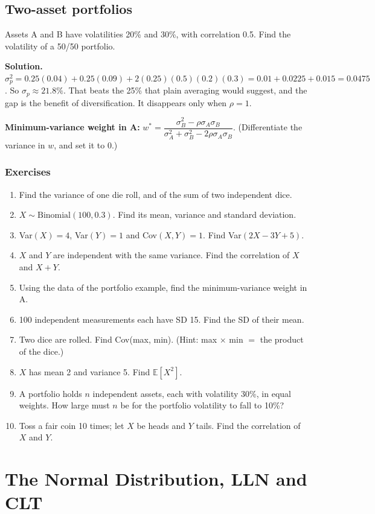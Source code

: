 \documentclass[11pt,a4paper,openany]{report}
\newenvironment{exercises}{\subsection*{Exercises \thechapter}\begin{enumerate}[label=\textbf{\thechapter.\arabic*},leftmargin=3.2em]}{\end{enumerate}}
\newcommand{\E}{\mathbb{E}}
\begin{document}
\section{Two-asset portfolios}
\begin{example}
Assets A and B have volatilities 20\% and 30\%, with correlation 0.5. Find the volatility of a 50/50 portfolio.

\textbf{Solution.} $\sigma_p^2=0.25(0.04)+0.25(0.09)+2(0.25)(0.5)(0.2)(0.3)=0.01+0.0225+0.015=0.0475$. So $\sigma_p\approx\mathbf{21.8\%}$. That beats the 25\% that plain averaging would suggest, and the gap is the benefit of diversification. It disappears only when $\rho=1$.
\end{example}
\textbf{Minimum-variance weight in A:} $w^*=\dfrac{\sigma_B^2-\rho\sigma_A\sigma_B}{\sigma_A^2+\sigma_B^2-2\rho\sigma_A\sigma_B}$. (Differentiate the variance in $w$, and set it to 0.)

\begin{exercises}
\item Find the variance of one die roll, and of the sum of two independent dice.
\item $X\sim\text{Binomial}(100,0.3)$. Find its mean, variance and standard deviation.
\item Var$(X)=4$, Var$(Y)=1$ and Cov$(X,Y)=1$. Find Var$(2X-3Y+5)$.
\item $X$ and $Y$ are independent with the same variance. Find the correlation of $X$ and $X+Y$.
\item Using the data of the portfolio example, find the minimum-variance weight in A.
\item 100 independent measurements each have SD 15. Find the SD of their mean.
\item Two dice are rolled. Find Cov(max, min). (Hint: max $\times$ min $=$ the product of the dice.)
\item $X$ has mean 2 and variance 5. Find $\E[X^2]$.
\item A portfolio holds $n$ independent assets, each with volatility 30\%, in equal weights. How large must $n$ be for the portfolio volatility to fall to 10\%?
\item Toss a fair coin 10 times; let $X$ be heads and $Y$ tails. Find the correlation of $X$ and $Y$.
\end{exercises}

\chapter{The Normal Distribution, LLN and CLT}\label{ch:clt}
\end{document}
